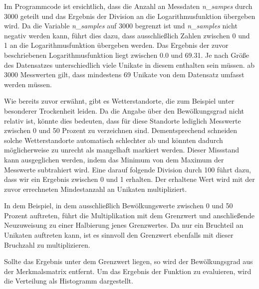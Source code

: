 \documentclass[12pt, a4paper]{article}
\begin{document}
Im Programmcode ist ersichtlich, dass die Anzahl an Messdaten \textit{n\_sampes} durch 3000 geteilt und das Ergebnis der Division an die Logarithmusfunktion übergeben wird. Da die Variable \textit{n\_samples} auf 3000 begrenzt ist und \textit{n\_samples} nicht negativ werden kann, führt dies dazu, dass ausschließlich Zahlen zwischen 0 und 1 an die Logarithmusfunktion übergeben werden. Das Ergebnis der zuvor beschriebenen Logarithmusfunktion liegt zwischen 0.0 und 69.31. Je nach Größe des Datensatzes unterschiedlich viele Unikate in diesem enthalten sein müssen. ab 3000 Messwerten gilt, dass mindestens 69 Unikate von dem Datensatz umfasst werden müssen.

Wie bereits zuvor erwähnt, gibt es Wetterstandorte, die zum Beispiel unter besonderer Trockenheit leiden. Da die Angabe über den Bewölkungsgrad nicht relativ ist, könnte dies bedeuten, dass für diese Standorte lediglich Messwerte zwischen 0 und 50 Prozent zu verzeichnen sind. Dementsprechend schneiden solche Wetterstandorte automatisch schlechter ab und könnten dadurch möglicherweise zu unrecht als mangelhaft markiert werden. Dieser Missstand kann ausgeglichen werden, indem das Minimum von dem Maximum der Messwerte subtrahiert wird. Eine darauf folgende Division durch 100 führt dazu, dass wir ein Ergebnis zwischen 0 und 1 erhalten. Der erhaltene Wert wird mit der zuvor errechneten Mindestanzahl an Unikaten multipliziert. 

In dem Beispiel, in dem ausschließlich Bewölkungswerte zwischen 0 und 50 Prozent auftreten, führt die Multiplikation mit dem Grenzwert und anschließende Neuzuweisung zu einer Halbierung jenes Grenzwertes. Da nur ein Bruchteil an Unikaten auftreten kann, ist es sinnvoll den Grenzwert ebenfalls mit dieser Bruchzahl zu multiplizieren. 

Sollte das Ergebnis unter dem Grenzwert liegen, so wird der Bewölkungsgrad aus der Merkmalsmatrix entfernt. Um das Ergebnis der Funktion zu evaluieren, wird  die Verteilung als Histogramm dargestellt. 
\end{document}
